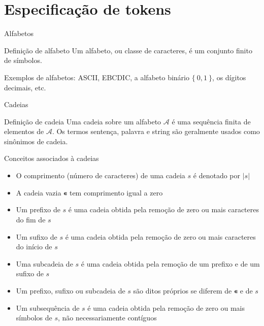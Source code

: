 \section{Especificação de tokens}

\begin{frame}[fragile]{Alfabetos}

    \begin{block}{Definição de alfabeto}
        Um alfabeto, ou classe de caracteres, é um conjunto finito de símbolos.
    \end{block}

    \vspace{0.2in}

    Exemplos de alfabetos: ASCII, EBCDIC, a alfabeto binário $\{\ 0, 1\ \}$, os dígitos decimais, etc.

\end{frame}

\begin{frame}[fragile]{Cadeias}

    \begin{block}{Definição de cadeia}
        Uma cadeia sobre um alfabeto $\mathcal{A}$ é uma sequência finita de elementos de $\mathcal{A}$. Os termos sentença, palavra e string são geralmente
        usados como sinônimos de cadeia.
    \end{block}

\end{frame}

\begin{frame}[fragile]{Conceitos associados à cadeias}

    \begin{itemize}
        \item O comprimento (número de caracteres) de uma cadeia $s$ é denotado por $|s|$

        \item A cadeia vazia \texttt{∊} tem comprimento igual a zero

        \item Um prefixo de $s$ é uma cadeia obtida pela remoção de zero ou mais caracteres do fim de $s$

        \item Um sufixo de $s$ é uma cadeia obtida pela remoção de zero ou mais caracteres do início de $s$

        \item Uma subcadeia de $s$ é uma cadeia obtida pela remoção de um prefixo e de um sufixo de $s$

        \item Um prefixo, sufixo ou subcadeia de $s$ são ditos próprios se diferem de \texttt{∊} e de $s$

        \item Um subsequência de $s$ é uma cadeia obtida pela remoção de zero ou mais símbolos de $s$, não necessariamente contíguos
    \end{itemize}

\end{frame}


